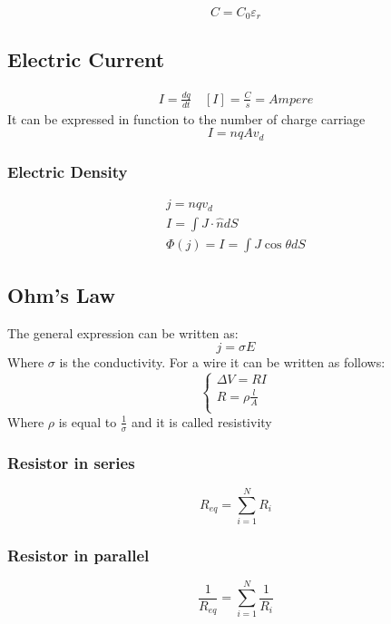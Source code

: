 \documentclass[Master.tex]{subfiles}
\begin{document}
\begin{multicols}{2}
				   \[
						    C = C_{0} \varepsilon_{r}
				   \]

		  \subsection{Electric Current}
				   \begin{gather*}
						    I = \frac{dq}{dt} \quad [I] = \frac{C}{s} = Ampere
				   \end{gather*}
				   It can be expressed in function to the number of charge carriage
				   \[
						    I = nqAv_{d}
				   \]

				   \subsubsection{Electric Density}

						    \begin{gather*}
								     j = n q v_{d} \\
								     I = \int J \cdot \hat{n} dS\\
								     \Phi (j) = I = \int J \cos \theta dS
						    \end{gather*}

		  \subsection{Ohm's Law}
				   The general expression can be written as:
				   \[
						    j = \sigma E
				   \]
				   Where \( \sigma \) is the conductivity. For a wire it can be written as
				   follows:
				   \begin{equation*}
						    \begin{cases}
								     \Delta V = R I       \\
								     R = \rho \frac{l}{A} \\
						    \end{cases}
				   \end{equation*}
				   Where \( \rho  \) is equal to \( \frac{1}{\sigma } \) and it is called resistivity
				   \subsubsection{Resistor in series}
						    \[
								     R_{eq} = \sum_{i = 1}^{N} R_{i}
						    \]

				   \subsubsection{Resistor in parallel}
						    \[
								     \frac{1}{R_{eq}} = \sum_{i = 1}^{N} \frac{1}{ R_{i}  }
						    \]


\end{multicols}
\end{document}
